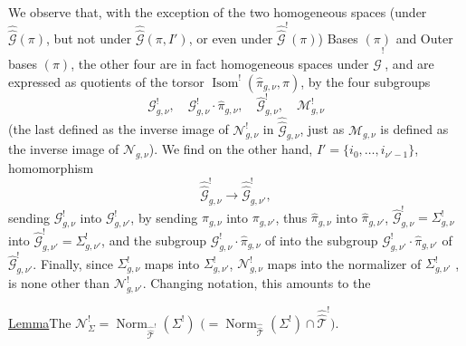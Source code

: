
We observe that, with the exception of the two homogeneous spaces
(under $\widehat{\widehat{\mathcal G}}(\pi)$, but not  under
$\widehat{\widehat{\mathcal G}}(\pi,I')$, or even under
$\widehat{\widehat{\mathcal G}}^{!}(\pi)$) Bases $(\pi)$ and Outer bases $(\pi)$,
the other four are in fact homogeneous spaces under
$\widehat{\widehat{\mathcal G}}^{!}$, and are expressed as quotients of the
torsor
$\operatorname{Isom}^{!}(\widehat{\pi}_{g,\nu},\pi)$, by the four subgroups
\[
\mathcal G^{!}_{g,\nu},\quad
\mathcal G^{!}_{g,\nu}\cdot\widehat{\pi}_{g,\nu},\quad
\widehat{\mathcal G}^{!}_{g,\nu},\quad
\mathcal M^{!}_{g,\nu}
\]
(the last defined as the inverse image of $\mathcal N^{!}_{g,\nu}$ in
$\widehat{\widehat{\mathcal G}}_{g,\nu}$, just as $\mathcal M_{g,\nu}$ is defined
as the inverse image of $\mathcal N_{g,\nu}$).
We find on the other hand,  $I'=\{i_0,\ldots,i_{\nu'-1}\}$,
 homomorphism
\[
\widehat{\widehat{\mathcal G}}^{!}_{g,\nu}\longrightarrow
\widehat{\widehat{\mathcal G}}^{!}_{g,\nu'},
\]
sending $\mathcal G^{!}_{g,\nu}$ into $\mathcal G^{!}_{g,\nu'}$,
by sending $\pi_{g,\nu}$ into $\pi_{g,\nu'}$, thus $\widehat{\pi}_{g,\nu}$
into $\widehat{\pi}_{g,\nu'}$,
$\widehat{\mathcal G}^{!}_{g,\nu}=\Sigma^{!}_{g,\nu}$ into
$\widehat{\mathcal G}^{!}_{g,\nu'}=\Sigma^{!}_{g,\nu'}$, and the subgroup
$\mathcal G^{!}_{g,\nu}\cdot\widehat{\pi}_{g,\nu}$ of
 
into the subgroup $\mathcal G^{!}_{g,\nu'}\cdot\widehat{\pi}_{g,\nu'}$ of
$\widehat{\mathcal G}^{!}_{g,\nu'}$.
Finally, since $\Sigma^{!}_{g,\nu}$ maps into $\Sigma^{!}_{g,\nu'}$,
 $\mathcal N^{!}_{g,\nu}$ maps into the normalizer
of $\Sigma^{!}_{g,\nu'}$ ,
 is none other than $\mathcal N^{!}_{g,\nu'}$.
Changing notation, this amounts to the

\uline{Lemma}\quad The
$\mathcal N^{!}_{\Sigma}=\operatorname{Norm}_{\widehat{\widehat{\mathcal T}}^{!}}(\Sigma^{!})$
$\bigl(=\operatorname{Norm}_{\widehat{\widehat{\mathcal T}}}(\Sigma^{!})\cap
\widehat{\widehat{\mathcal T}}^{!}\bigr)$.


